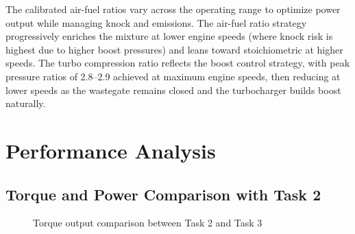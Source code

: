 The calibrated air-fuel ratios vary across the operating range to optimize power output while managing knock and emissions. The air-fuel ratio strategy progressively enriches the mixture at lower engine speeds (where knock risk is highest due to higher boost pressures) and leans toward stoichiometric at higher speeds. The turbo compression ratio reflects the boost control strategy, with peak pressure ratios of 2.8--2.9 achieved at maximum engine speeds, then reducing at lower speeds as the wastegate remains closed and the turbocharger builds boost naturally.

\section{Performance Analysis}

\subsection{Torque and Power Comparison with Task 2}

\begin{figure}[H]
  \centering
  \caption{Torque output comparison between Task 2 and Task 3}
  \label{fig:task3_torque_comparison}
\end{figure}

